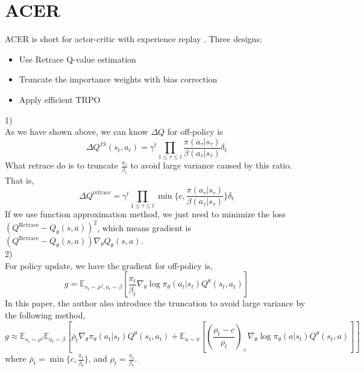 \documentclass[11pt,a4paper]{article}
\def\bar{\overline}
\def\E{\mathbb{E}}
\begin{document}
\section{ACER}
ACER is short for actor-critic with experience replay \cite{wang2016sample}. Three designs: 
\begin{itemize}
    \item Use Retrace Q-value estimation
    \item Truncate the importance weights with bias correction
    \item Apply efficient TRPO
\end{itemize}
1)\\
As we have shown above, we can know $\Delta Q$ for off-policy is 
\begin{equation}
    \Delta Q^{IS}(s_t,a_t) = \gamma^t \prod_{1\le \tau \le t} \frac{\pi(a_{\tau}|s_{\tau})}{\beta(a_{\tau}|s_{\tau})}\delta_t
\end{equation}
What retrace do is to truncate $\frac{\pi_\tau}{\beta_\tau}$ to avoid large variance caused by this ratio. That is,
\begin{equation}
    \Delta Q^{\mathrm{retrace}} =  \gamma^t \prod_{1\le \tau \le t} \min\{c,\frac{\pi(a_{\tau}|s_{\tau})}{\beta(a_{\tau}|s_{\tau})}\}\delta_t
\end{equation}
If we use function approximation method, we just need to minimize the loss $(Q^{\mathrm{Retrace}}-Q_{\theta}(s,a))^2$, which means gradient is $(Q^{\mathrm{Retrace}}-Q_{\theta}(s,a))\nabla_{\theta}Q_{\theta}(s,a)$. \\ 
2)\\ 
For policy update, we have the gradient for off-policy is,
\begin{equation}
    g = \E_{s_t\sim \rho^\beta, a_t\sim \beta}[\frac{\pi_t}{\beta_t} \nabla_\theta \log \pi_\theta(a_t|s_t) Q^{\theta}(s_t,a_t)]
\end{equation}
In this paper, the author also introduce the truncation to avoid large variance by the following method,
\begin{equation}
    g \approx \E_{s_t\sim \rho^\beta} \E_{a_t\sim \beta}[\bar{\rho}_t \nabla_\theta\pi_\theta(a_t|s_t)Q^{\theta}(s_t,a_t) + \E_{a\sim \pi}[(\frac{\rho_t-c}{\rho_t})_+ \nabla_\theta \log\pi_\theta(a|s_t) Q^{\theta}(s_t,a)]]
\end{equation}
where $\bar{\rho}_t = \min\{c, \frac{\pi_t}{\beta_t}\}$, and $\rho_t = \frac{\pi_t}{\beta_t}$.\\ 
\end{document}
